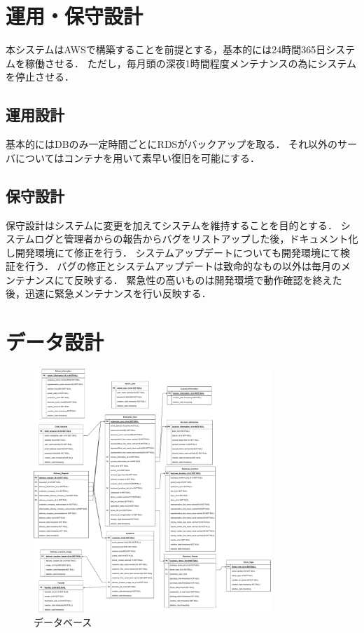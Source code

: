 \documentclass[a4paper, titlepage]{jsarticle}
\begin{document}
\section{運用・保守設計}
本システムはAWSで構築することを前提とする，基本的には24時間365日システムを稼働させる．
ただし，毎月頭の深夜1時間程度メンテナンスの為にシステムを停止させる．
\subsection{運用設計}
基本的にはDBのみ一定時間ごとにRDSがバックアップを取る．
それ以外のサーバについてはコンテナを用いて素早い復旧を可能にする．

\subsection{保守設計}
保守設計はシステムに変更を加えてシステムを維持することを目的とする．
システムログと管理者からの報告からバグをリストアップした後，ドキュメント化し開発環境にて修正を行う．
システムアップデートについても開発環境にて検証を行う．
バグの修正とシステムアップデートは致命的なもの以外は毎月のメンテナンスにて反映する．
緊急性の高いものは開発環境で動作確認を終えた後，迅速に緊急メンテナンスを行い反映する．
\section{データ設計}
\begin{figure}[H]
  \centering
  \includegraphics[width=0.8\textwidth]{other/database.pdf}
  \caption{データベース}
  \label{fig:database}
\end{figure}
\end{document}

